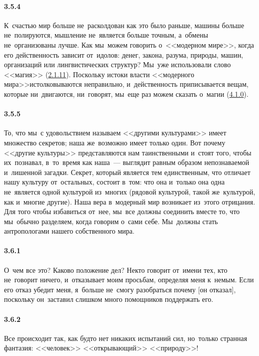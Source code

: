 
\paragraph{3.5.4}\hypertarget{par:3.5.4}{} К~счастью мир больше не~расколдован как это было раньше, машины больше не~полируются, мышление не~является больше точным, а~обмены не~организованы лучше.
Как мы~можем говорить о~<<модерном мире>>, когда его действенность зависит от~идолов: денег, закона, разума, природы, машин, организаций или лингвистических структур? Мы~уже использовали слово <<магия>> (\hyperlink{par:2.1.11}{2.1.11}). Поскольку истоки власти <<модерного мира>>истолковываются неправильно, и~действенность приписывается вещам, которые ни~двигаются, ни~говорят, мы~еще раз можем сказать о~магии (\hyperlink{par:4.1.0}{4.1.0}).

\paragraph{3.5.5}\hypertarget{par:3.5.5}{} То, что мы~с удовольствием называем <<другими культурами>> имеет множество секретов; наша же~возможно имеет только один. Вот почему <<другие культуры>> представляются нам таинственными и~стоят того, чтобы их~познавал, в~то~время как наша~--- выглядит равным образом непознаваемой и~лишенной загадки. Секрет, который является тем единственным, что отличает нашу культуру от~остальных, состоит в~том: что она и~только она одна не~является одной культурой из~многих (рядовой культурой, такой же~культурой, как и~многие другие). Наша вера в~модерный мир возникает из~этого отрицания. Для того чтобы избавиться от~нее, мы~все должны соединить вместе то, что мы~обычно разделяем, когда говорим о~сами себе. Мы~должны стать антропологами нашего собственного мира.

\paragraph{3.6.1}\hypertarget{par:3.6.1}{} О~чем все это? Каково положение дел? Некто говорит от~имени тех, кто не~говорит ничего, и~отказывает моим просьбам, определяя меня к~немым. Если его отказ убедит меня, я~больше не~смогу разобраться почему [он отказал], поскольку он~заставил слишком
много помощников поддержать его.

\paragraph{3.6.2}\hypertarget{par:3.6.2}{} Все происходит так, как будто нет никаких испытаний сил, но~только странная фантазия: <<человек>> <<открывающий>> <<природу>>!

